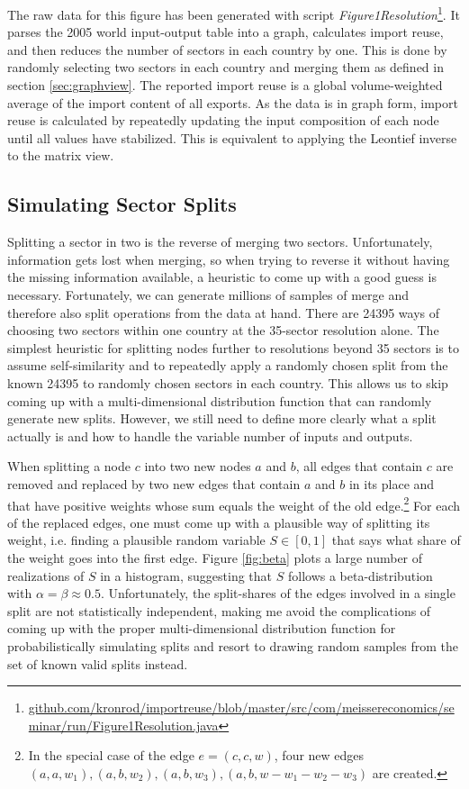 \documentclass[english]{uzhpub}
\begin{document}
The raw data for this figure has been generated with script \emph{Figure1Resolution}\footnote{\href{https://github.com/kronrod/importreuse/blob/master/src/com/meissereconomics/seminar/run/Figure1Resolution.java}{github.com/kronrod/importreuse/blob/master/src/com/meissereconomics/seminar/run/Figure1Resolution.java}}. It parses the 2005 world input-output table into a graph, calculates import reuse, and then reduces the number of sectors in each country by one. This is done by randomly selecting two sectors in each country and merging them as defined in section \ref{sec:graphview}. The reported import reuse is a global volume-weighted average of the import content of all exports. As the data is in graph form, import reuse is calculated by repeatedly updating the input composition of each node until all values have stabilized. This is equivalent to applying the Leontief inverse to the matrix view.

\subsection{Simulating Sector Splits}
Splitting a sector in two is the reverse of merging two sectors. Unfortunately, information gets lost when merging, so when trying to reverse it without having the missing information available, a heuristic to come up with a good guess is necessary. Fortunately, we can generate millions of samples of merge and therefore also split operations from the data at hand. There are 24395 ways of choosing two sectors within one country at the 35-sector resolution alone. The simplest heuristic for splitting nodes further to resolutions beyond 35 sectors is to assume self-similarity and to repeatedly apply a randomly chosen split from the known 24395 to randomly chosen sectors in each country. This allows us to skip coming up with a multi-dimensional distribution function that can randomly generate new splits. However, we still need to define more clearly what a split actually is and how to handle the variable number of inputs and outputs.

When splitting a node $c$ into two new nodes $a$ and $b$, all edges that contain $c$ are removed and replaced by two new edges that contain $a$ and $b$ in its place and that have positive weights whose sum equals the weight of the old edge.\footnote{In the special case of the edge $e=(c, c, w)$, four new edges $(a, a, w_1), (a, b, w_2), (a, b, w_3), (a, b, w - w_1 - w_2 - w_3)$ are created.} For each of the replaced edges, one must come up with a plausible way of splitting its weight, i.e. finding a plausible random variable $S \in [0,1]$  that says what share of the weight goes into the first edge. Figure \ref{fig:beta} plots a large number of realizations of $S$ in a histogram, suggesting that $S$ follows a beta-distribution with $\alpha=\beta\approx0.5$. Unfortunately, the split-shares of the edges involved in a single split are not statistically independent, making me avoid the complications of coming up with the proper multi-dimensional distribution function for probabilistically simulating splits and resort to drawing random samples from the set of known valid splits instead.
\end{document}
